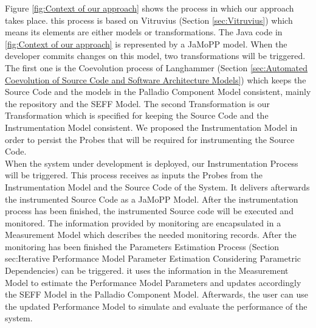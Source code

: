 Figure \ref{fig:Context of our approach} shows the process in which our approach takes place. this process is based on Vitruvius (Section \ref{sec:Vitruvius}) which means its elements are either models or transformations. The Java code in \ref{fig:Context of our approach} is represented by a JaMoPP model. When the developer commits changes on this model, two transformations will be triggered. The first one is the Coevolution process of Langhammer (Section \ref{sec:Automated Coevolution of Source Code and Software Architecture Models}) which keeps the Source Code and the models in the Palladio Component Model consistent, mainly the repository and the SEFF Model. The second Transformation is our Transformation which is specified for keeping the Source Code and the Instrumentation Model consistent. We proposed the Instrumentation Model in order to persist the Probes that will be required for instrumenting the Source Code.\\

When the system under development is deployed, our Instrumentation Process will be triggered. This process receives as inputs the Probes from the Instrumentation Model and the Source Code of the System. It delivers afterwards the instrumented Source Code as a JaMoPP Model. After the instrumentation process has been finished, the instrumented Source code will be executed and monitored.  The information provided by monitoring are encapsulated in a Measurement Model which describes the needed monitoring records.  After the monitoring has been finished the Parameters Estimation Process (Section sec:Iterative Performance Model Parameter Estimation Considering Parametric Dependencies) can be triggered. it uses the information in the Measurement Model to estimate the Performance Model Parameters and updates accordingly the SEFF Model in the Palladio Component Model. Afterwards, the user can use the updated Performance Model to simulate and evaluate the performance of the system. \\


